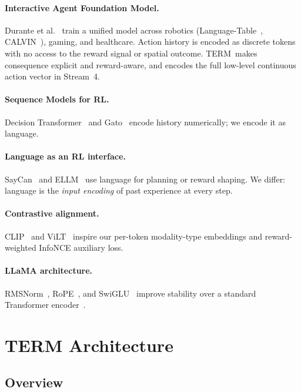 \documentclass{article}
\newcommand{\modelname}{\textsc{TERM}\xspace}
\begin{document}
\paragraph{Interactive Agent Foundation Model.}
Durante et al.~\citep{durante2024agent} train a unified model across
robotics (Language-Table~\citep{lynch2023languagetable},
CALVIN~\citep{mees2022calvin}), gaming, and healthcare.
Action history is encoded as discrete tokens with no access to the reward
signal or spatial outcome.
\modelname\ makes consequence explicit and reward-aware, and
encodes the full low-level continuous action vector in Stream~4.

\paragraph{Sequence Models for RL.}
Decision Transformer~\citep{chen2021decision} and Gato~\citep{reed2022gato}
encode history numerically; we encode it as language.

\paragraph{Language as an RL interface.}
SayCan~\citep{ahn2022saycan} and ELLM~\citep{du2023ellm} use language for
planning or reward shaping.
We differ: language is the \emph{input encoding} of past experience at
every step.

\paragraph{Contrastive alignment.}
CLIP~\citep{radford2021clip} and ViLT~\citep{kim2021vilt} inspire our
per-token modality-type embeddings and reward-weighted InfoNCE auxiliary loss.

\paragraph{LLaMA architecture.}
RMSNorm~\citep{zhang2019rmsnorm}, RoPE~\citep{su2021rope}, and
SwiGLU~\citep{shazeer2020swiglu} improve stability over a standard
Transformer encoder~\citep{vaswani2017attention}.

\section{TERM Architecture}
\label{sec:model}

\subsection{Overview}
\end{document}

